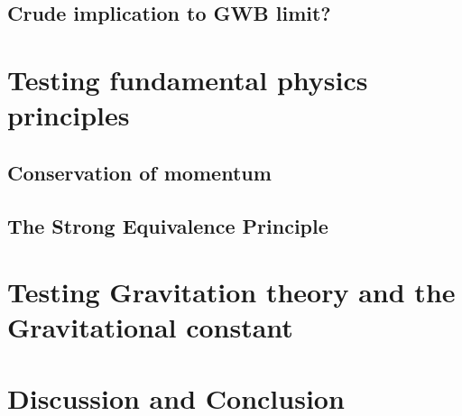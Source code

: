 \subsection{Crude implication to GWB limit?}

\section{Testing fundamental physics principles}
\subsection{Conservation of momentum}
\subsection{The Strong Equivalence Principle}

\section{Testing Gravitation theory and the Gravitational
constant}

\section{Discussion and Conclusion}
